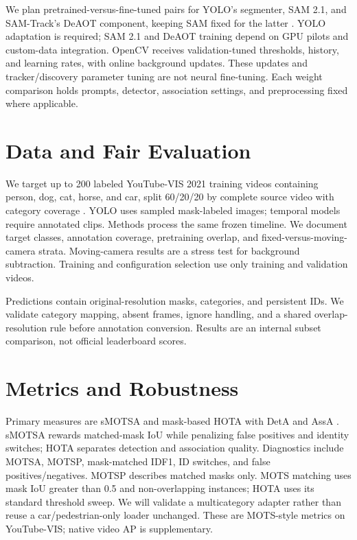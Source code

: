 \documentclass[11pt]{article}
\begin{document}
We plan pretrained-versus-fine-tuned pairs for YOLO's segmenter, SAM 2.1, and SAM-Track's DeAOT component, keeping SAM fixed for the latter \citep{yang2022}. YOLO adaptation is required; SAM 2.1 and DeAOT training depend on GPU pilots and custom-data integration. OpenCV receives validation-tuned thresholds, history, and learning rates, with online background updates. These updates and tracker/discovery parameter tuning are not neural fine-tuning. Each weight comparison holds prompts, detector, association settings, and preprocessing fixed where applicable.

\section{Data and Fair Evaluation}

We target up to 200 labeled YouTube-VIS 2021 training videos containing person, dog, cat, horse, and car, split 60/20/20 by complete source video with category coverage \citep{yang2021}. YOLO uses sampled mask-labeled images; temporal models require annotated clips. Methods process the same frozen timeline. We document target classes, annotation coverage, pretraining overlap, and fixed-versus-moving-camera strata. Moving-camera results are a stress test for background subtraction. Training and configuration selection use only training and validation videos.

Predictions contain original-resolution masks, categories, and persistent IDs. We validate category mapping, absent frames, ignore handling, and a shared overlap-resolution rule before annotation conversion. Results are an internal subset comparison, not official leaderboard scores.

\section{Metrics and Robustness}

Primary measures are sMOTSA and mask-based HOTA with DetA and AssA \citep{voigtlaender2019,luiten2020}. sMOTSA rewards matched-mask IoU while penalizing false positives and identity switches; HOTA separates detection and association quality. Diagnostics include MOTSA, MOTSP, mask-matched IDF1, ID switches, and false positives/negatives. MOTSP describes matched masks only. MOTS matching uses mask IoU greater than 0.5 and non-overlapping instances; HOTA uses its standard threshold sweep. We will validate a multicategory adapter rather than reuse a car/pedestrian-only loader unchanged. These are MOTS-style metrics on YouTube-VIS; native video AP is supplementary.
\end{document}
